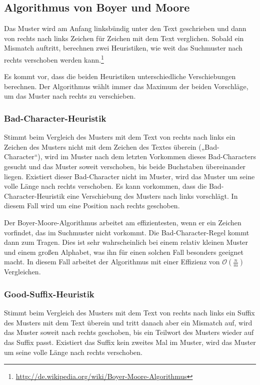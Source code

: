 \subsection{Algorithmus von Boyer und Moore}
Das Muster wird am Anfang linksbündig unter den Text geschrieben und dann von rechts nach links Zeichen für Zeichen mit dem Text verglichen. Sobald ein Mismatch auftritt, berechnen zwei Heuristiken, wie weit das Suchmuster nach rechts verschoben werden kann.\footnote{\url{http://de.wikipedia.org/wiki/Boyer-Moore-Algorithmus}}

Es kommt vor, dass die beiden Heuristiken unterschiedliche Verschiebungen berechnen. Der Algorithmus wählt immer das Maximum der beiden Vorschläge, um das Muster nach rechts zu verschieben.

\subsubsection{Bad-Character-Heuristik}
Stimmt beim Vergleich des Musters mit dem Text von rechts nach links ein Zeichen des Musters nicht mit dem Zeichen des Textes überein („Bad-Character“), wird im Muster nach dem letzten Vorkommen dieses Bad-Characters gesucht und das Muster soweit verschoben, bis beide Buchstaben übereinander liegen. Existiert dieser Bad-Character nicht im Muster, wird das Muster um seine volle Länge nach rechts verschoben. Es kann vorkommen, dass die Bad-Character-Heuristik eine Verschiebung des Musters nach links vorschlägt. In diesem Fall wird um eine Position nach rechts geschoben.

Der Boyer-Moore-Algorithmus arbeitet am effizientesten, wenn er ein Zeichen vorfindet, das im Suchmuster nicht vorkommt. Die Bad-Character-Regel kommt dann zum Tragen. Dies ist sehr wahrscheinlich bei einem relativ kleinen Muster und einem großen Alphabet, was ihn für einen solchen Fall besonders geeignet macht. In diesem Fall arbeitet der Algorithmus mit einer Effizienz von \(\mathcal{O}(\frac{n}{m})\) Vergleichen.

\subsubsection{Good-Suffix-Heuristik}
Stimmt beim Vergleich des Musters mit dem Text von rechts nach links ein Suffix des Musters mit dem Text überein und tritt danach aber ein Mismatch auf, wird das Muster soweit nach rechts geschoben, bis ein Teilwort des Musters wieder auf das Suffix passt. Existiert das Suffix kein zweites Mal im Muster, wird das Muster um seine volle Länge nach rechts verschoben.

